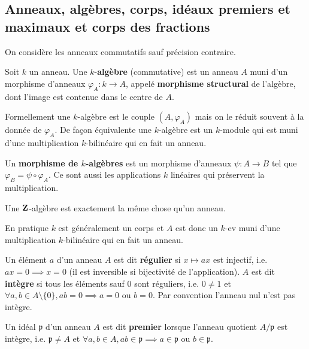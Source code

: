 \subsection{Anneaux, algèbres, corps, idéaux premiers et maximaux et corps des fractions}

	On considère les anneaux commutatifs sauf précision contraire.

	\begin{defn}
		Soit $k$ un anneau.
		Une $k$-\textbf{algèbre} (commutative) est un anneau $A$ muni d'un morphisme d'anneaux $\varphi_A \colon k \to A$, appelé \textbf{morphisme structural} de l'algèbre, dont l'image est contenue dans le centre de $A$.
	\end{defn}
	
	Formellement une $k$-algèbre est le couple $(A,\varphi_A)$ mais on le réduit souvent à la donnée de $\varphi_A$.
	De façon équivalente une $k$-algèbre est un $k$-module qui est muni d'une multiplication $k$-bilinéaire qui en fait un anneau.
	
	\begin{defn}
		Un \textbf{morphisme de $k$-algèbres} est un morphisme d'anneaux $\psi \colon A \to B$ tel que $\varphi_B = \psi \circ \varphi_A$.
		Ce sont aussi les applications $k$ linéaires qui préservent la multiplication.
	\end{defn}

	\begin{rem}
		Une $\mathbf{Z}$-algèbre est exactement la même chose qu'un anneau.
	\end{rem}

	En pratique $k$ est généralement un corps et $A$ est donc un $k$-ev muni d'une multiplication $k$-bilinéaire qui en fait un anneau.
	
	\begin{defn}
		Un élément $a$ d'un anneau $A$ est dit \textbf{régulier} si $x \mapsto ax$ est injectif, i.e. $ax = 0 \implies x = 0$ (il est inversible si bijectivité de l'application).
		$A$ est dit \textbf{intègre} si tous les éléments sauf $0$ sont réguliers, i.e. $0 \neq 1$ et $\forall a,b \in A \setminus \{ 0 \}, ab = 0 \implies a = 0 \text{ ou } b = 0$.
		Par convention l'anneau nul n'est pas intègre.
	\end{defn}

	\begin{defn}
		Un idéal $\mathfrak{p}$ d'un anneau $A$ est dit \textbf{premier} lorsque l'anneau quotient $A / \mathfrak{p}$ est intègre, i.e. $\mathfrak{p} \neq A$ et $\forall a,b \in A, ab \in \mathfrak{p} \implies a \in \mathfrak{p} \text{ ou } b \in \mathfrak{p}$.
	\end{defn}

